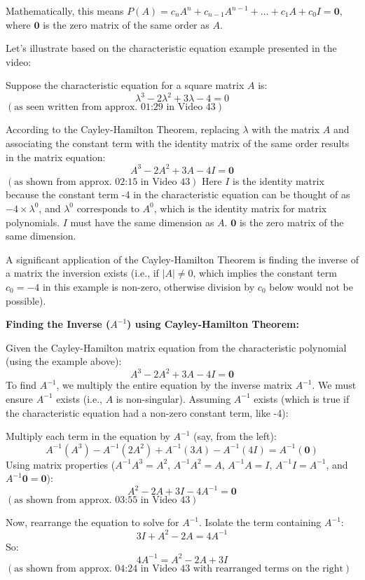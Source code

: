 \documentclass{article}
\begin{document}
Mathematically, this means $P(A) = c_n A^n + c_{n-1}A^{n-1} + \dots + c_1 A + c_0 I = \mathbf{0}$, where $\mathbf{0}$ is the zero matrix of the same order as $A$.

Let's illustrate based on the characteristic equation example presented in the video:

Suppose the characteristic equation for a square matrix $A$ is:
\[ \lambda^3 - 2\lambda^2 + 3\lambda - 4 = 0 \]
$( \text{as seen written from approx. 01:29 in Video 43})$

According to the Cayley-Hamilton Theorem, replacing $\lambda$ with the matrix $A$ and associating the constant term with the identity matrix of the same order results in the matrix equation:
\[ A^3 - 2A^2 + 3A - 4I = \mathbf{0} \]
$(\text{as shown from approx. 02:15 in Video 43})$
Here $I$ is the identity matrix because the constant term -4 in the characteristic equation can be thought of as $-4 \times \lambda^0$, and $\lambda^0$ corresponds to $A^0$, which is the identity matrix for matrix polynomials. $I$ must have the same dimension as $A$. $\mathbf{0}$ is the zero matrix of the same dimension.

A significant application of the Cayley-Hamilton Theorem is finding the inverse of a matrix the inversion exists (i.e., if $|A| \neq 0$, which implies the constant term $c_0=-4$ in this example is non-zero, otherwise division by $c_0$ below would not be possible).

\textbf{Finding the Inverse ($A^{-1}$) using Cayley-Hamilton Theorem:}

Given the Cayley-Hamilton matrix equation from the characteristic polynomial (using the example above):
\[ A^3 - 2A^2 + 3A - 4I = \mathbf{0} \]
To find $A^{-1}$, we multiply the entire equation by the inverse matrix $A^{-1}$. We must ensure $A^{-1}$ exists (i.e., $A$ is non-singular). Assuming $A^{-1}$ exists (which is true if the characteristic equation had a non-zero constant term, like -4):

Multiply each term in the equation by $A^{-1}$ (say, from the left):
\[ A^{-1}(A^3) - A^{-1}(2A^2) + A^{-1}(3A) - A^{-1}(4I) = A^{-1}(\mathbf{0}) \]
Using matrix properties ($A^{-1}A^3 = A^2$, $A^{-1}A^2 = A$, $A^{-1}A = I$, $A^{-1}I = A^{-1}$, and $A^{-1}\mathbf{0} = \mathbf{0}$):
\[ A^2 - 2A + 3I - 4A^{-1} = \mathbf{0} \]
$(\text{as shown from approx. 03:55 in Video 43})$

Now, rearrange the equation to solve for $A^{-1}$. Isolate the term containing $A^{-1}$:
\[ 3I + A^2 - 2A = 4A^{-1} \]
So:
\[ 4A^{-1} = A^2 - 2A + 3I \]
$(\text{as shown from approx. 04:24 in Video 43 with rearranged terms on the right})$
\end{document}

